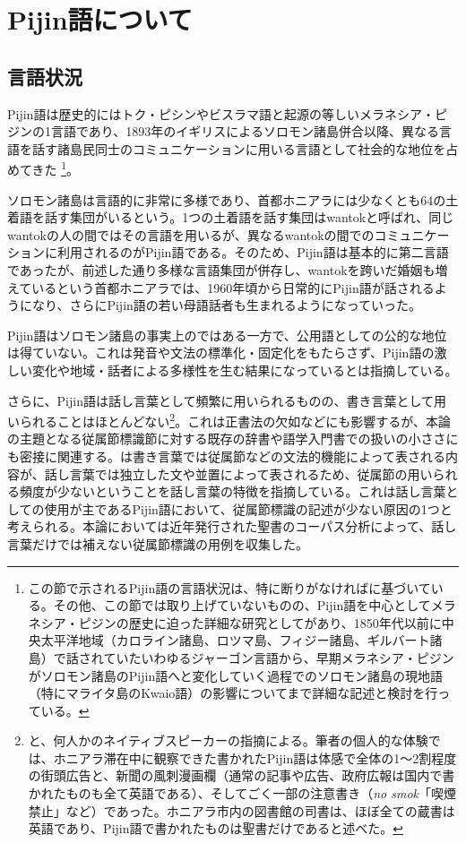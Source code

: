 \section{Pijin語について}
\subsection{言語状況}
Pijin語は歴史的にはトク・ピシンやビスラマ語と起源の等しいメラネシア・ピジンの1言語であり、1893年のイギリスによるソロモン諸島併合以降、異なる言語を話す諸島民同士のコミュニケーションに用いる言語として社会的な地位を占めてきた
\footnote{
この節で示されるPijin語の言語状況は、特に断りがなければ\cite{phonology}に基づいている。その他、この節では取り上げていないものの、Pijin語を中心としてメラネシア・ピジンの歴史に迫った詳細な研究として\cite{keesing}があり、1850年代以前に中央太平洋地域（カロライン諸島、ロツマ島、フィジー諸島、ギルバート諸島）で話されていたいわゆるジャーゴン言語から、早期メラネシア・ピジンがソロモン諸島のPijin語へと変化していく過程でのソロモン諸島の現地語（特にマライタ島のKwaio語）の影響についてまで詳細な記述と検討を行っている。}。

ソロモン諸島は言語的に非常に多様であり、首都ホニアラには少なくとも64の土着語を話す集団がいるという\citep{nativization}。1つの土着語を話す集団はwantokと呼ばれ、同じwantokの人の間ではその言語を用いるが、異なるwantokの間でのコミュニケーションに利用されるのがPijin語である。そのため、Pijin語は基本的に第二言語であったが、前述した通り多様な言語集団が併存し、wantokを跨いだ婚姻も増えているという首都ホニアラでは、1960年頃から日常的にPijin語が話されるようになり、さらにPijin語の若い母語話者も生まれるようになっていった。

Pijin語はソロモン諸島の事実上のではある一方で、公用語としての公的な地位は得ていない。これは発音や文法の標準化・固定化をもたらさず、Pijin語の激しい変化や地域・話者による多様性を生む結果になっていると\cite{phonology}は指摘している。

さらに、Pijin語は話し言葉として頻繁に用いられるものの、書き言葉として用いられることはほとんどない\footnote{
\cite{phonology}と、何人かのネイティブスピーカーの指摘による。筆者の個人的な体験では、ホニアラ滞在中に観察できた書かれたPijin語は体感で全体の1～2割程度の街頭広告と、新聞の風刺漫画欄（通常の記事や広告、政府広報は国内で書かれたものも全て英語である）、そしてごく一部の注意書き（\textit{no smok}「喫煙禁止」など）であった。ホニアラ市内の図書館の司書は、ほぼ全ての蔵書は英語であり、Pijin語で書かれたものは聖書だけであると述べた。}。これは正書法の欠如などにも影響するが、本論の主題となる従属節標識節に対する既存の辞書や語学入門書での扱いの小ささにも密接に関連する。\cite{chafe}は書き言葉では従属節などの文法的機能によって表される内容が、話し言葉では独立した文や並置によって表されるため、従属節の用いられる頻度が少ないということを話し言葉の特徴を指摘している。これは話し言葉としての使用が主であるPijin語において、従属節標識の記述が少ない原因の1つと考えられる。本論においては近年発行された聖書のコーパス分析によって、話し言葉だけでは補えない従属節標識の用例を収集した。

